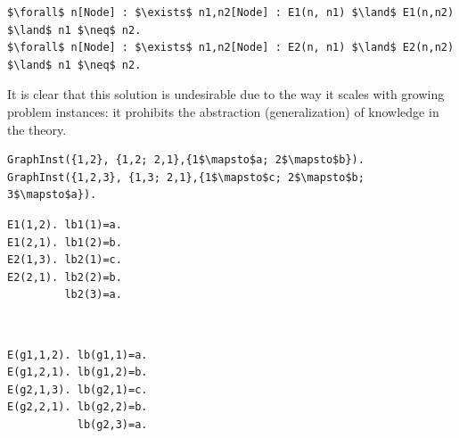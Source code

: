 \begin{minipage}{\linewidth}
\begin{center}
\begin{lstlisting}[style=small,mathescape]
$\forall$ n[Node] : $\exists$ n1,n2[Node] : E1(n, n1) $\land$ E1(n,n2) $\land$ n1 $\neq$ n2.
$\forall$ n[Node] : $\exists$ n1,n2[Node] : E2(n, n1) $\land$ E2(n,n2) $\land$ n1 $\neq$ n2.
\end{lstlisting}
\end{center}
\end{minipage}
\noindent It is clear that this solution is undesirable due to the way it scales 
with growing problem instances: it prohibits the abstraction (generalization) of knowledge in the theory.

\begin{minipage}{\linewidth}
\begin{center}
\begin{minipage}{0.80\linewidth}
  \begin{lstlisting}[style=small,mathescape,caption=Higher order predicate modeling the set $\graphset{G}_{+}$ of \textbf{Def.}~\ref{def:gm2}.,label=lst:HOPred]
GraphInst({1,2}, {1,2; 2,1},{1$\mapsto$a; 2$\mapsto$b}).
GraphInst({1,2,3}, {1,3; 2,1},{1$\mapsto$c; 2$\mapsto$b; 3$\mapsto$a}).
\end{lstlisting}
\end{minipage}
\end{center}
\vspace{-2em}

\begin{minipage}[t]{0.45\linewidth}
\begin{lstlisting}[style=small,mathescape,caption=Multiple individual global relations,label=lst:multiglobal]
E1(1,2). lb1(1)=a.
E1(2,1). lb1(2)=b.
E2(1,3). lb2(1)=c.
E2(2,1). lb2(2)=b.
         lb2(3)=a.
\end{lstlisting}
\end{minipage}
\begin{minipage}[t]{0.1\linewidth}
 ~
\end{minipage}
\begin{minipage}[t]{0.45\linewidth}
\begin{lstlisting}[style=small,mathescape,caption=Disjoint union using indexed global relations,label=lst:indexedglobal]
E(g1,1,2). lb(g1,1)=a.
E(g1,2,1). lb(g1,2)=b.
E(g2,1,3). lb(g2,1)=c.
E(g2,2,1). lb(g2,2)=b.
           lb(g2,3)=a.
\end{lstlisting}
\end{minipage}
\end{minipage}

